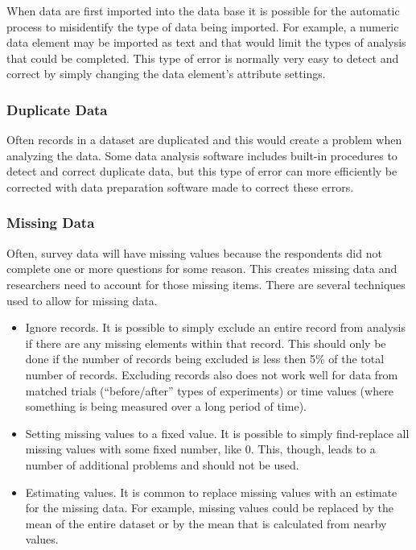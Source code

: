 When data are first imported into the data base it is possible for the automatic process to misidentify the type of data being imported. For example, a numeric data element may be imported as text and that would limit the types of analysis that could be completed. This type of error is normally very easy to detect and correct by simply changing the data element's attribute settings.

\subsubsection{Duplicate Data}

Often records in a dataset are duplicated and this would create a problem when analyzing the data. Some data analysis software includes built-in procedures to detect and correct duplicate data, but this type of error can more efficiently be corrected with data preparation software made to correct these errors.

\subsubsection{Missing Data}

Often, survey data will have missing values because the respondents did not complete one or more questions for some reason. This creates missing data and researchers need to account for those missing items. There are several techniques used to allow for missing data.

\begin{itemize}
  \item Ignore records. It is possible to simply exclude an entire record from analysis if there are any missing elements within that record. This should only be done if the number of records being excluded is less then 5\% of the total number of records. Excluding records also does not work well for data from matched trials (``before/after'' types of experiments) or time values (where something is being measured over a long period of time).
  \item Setting missing values to a fixed value. It is possible to simply find-replace all missing values with some fixed number, like $ 0 $. This, though, leads to a number of additional problems and should not be used.
  \item Estimating values. It is common to replace missing values with an estimate for the missing data. For example, missing values could be replaced by the mean of the entire dataset or by the mean that is calculated from nearby values.
\end{itemize}

